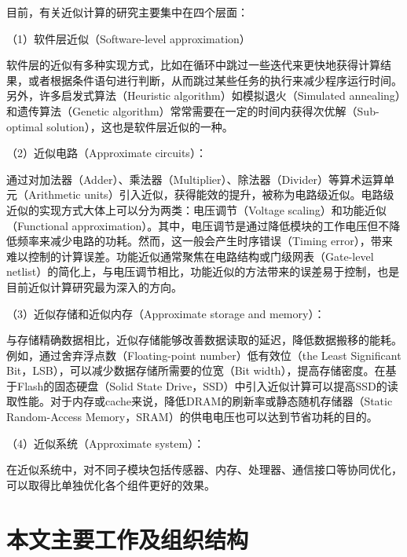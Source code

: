 目前，有关近似计算的研究主要集中在四个层面：

（1）软件层近似（Software-level approximation）

软件层的近似有多种实现方式，比如在循环中跳过一些迭代来更快地获得计算结果，或者根据条件语句进行判断，从而跳过某些任务的执行来减少程序运行时间。另外，许多启发式算法（Heuristic algorithm）如模拟退火（Simulated annealing）和遗传算法（Genetic algorithm）常常需要在一定的时间内获得次优解（Sub-optimal solution），这也是软件层近似的一种。

（2）近似电路（Approximate circuits）：

通过对加法器（Adder）\cite{AC:Aadd:simple_yet}、乘法器（Multiplier）\cite{AC:AM:Adapt}、除法器（Divider）\cite{AC:Div:2019dac}等算术运算单元（Arithmetic units）引入近似，获得能效的提升，被称为电路级近似。电路级近似的实现方式大体上可以分为两类：电压调节（Voltage scaling）和功能近似（Functional approximation）\cite{AC:ALS:survey}。其中，电压调节是通过降低模块的工作电压但不降低频率来减少电路的功耗。然而，这一般会产生时序错误（Timing error），带来难以控制的计算误差\cite{AC:Arith:overscale}。功能近似通常聚焦在电路结构或门级网表（Gate-level netlist）的简化上，与电压调节相比，功能近似的方法带来的误差易于控制，也是目前近似计算研究最为深入的方向\cite{AC:Arith:survey_hanjie}。

（3）近似存储和近似内存（Approximate storage and memory）：

与存储精确数据相比，近似存储能够改善数据读取的延迟，降低数据搬移的能耗。例如，通过舍弃浮点数（Floating-point number）低有效位（the Least Significant Bit，LSB），可以减少数据存储所需要的位宽（Bit width），提高存储密度。在基于Flash的固态硬盘（Solid State Drive，SSD）中引入近似计算可以提高SSD的读取性能\cite{AC:Store:ASCache}。对于内存或cache来说，降低DRAM的刷新率\cite{AC:Store:DRAM}或静态随机存储器（Static Random-Access Memory，SRAM）\cite{AC:Store:SRAM}的供电电压也可以达到节省功耗的目的。

（4）近似系统（Approximate system）：

在近似系统中，对不同子模块包括传感器、内存、处理器、通信接口等协同优化，可以取得比单独优化各个组件更好的效果\cite{AC:Sys:camera}。




\section{本文主要工作及组织结构}

